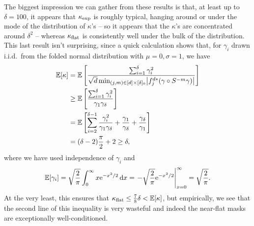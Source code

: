 The biggest impression we can gather from these results is that, at least up to $\delta = 100$, it appears that $\kappa_{\rm exp}$ is roughly typical, hanging around or under the mode of the distribution of $\kappa$'s -- so it appears that the $\kappa$'s are concentrated around $\delta^2$ -- whereas $\kappa_{\rm flat}$ is consistently well under the bulk of the distribution.  This last result isn't surprising, since a quick calculation shows that, for $\gamma_i$ drawn i.i.d.~from the folded normal distribution with $\mu = 0, \sigma = 1$, we have
\begin{align*}
  \E[\kappa] &= \E\left[\dfrac{\sum_{i = 1}^\delta \gamma_i^2}{\sqrt{d} \min_{(j, m) \in [d] \times [\delta]_0} \abs*{f_j^{d*} (\gamma \circ S^{-m} \gamma)}}\right] \\
  &\ge \E\left[\dfrac{\sum_{i = 1}^\delta \gamma_i^2}{\gamma_1 \gamma_\delta}\right] \\
  &= \E\left[\sum_{i = 2}^{\delta - 1} \frac{\gamma_i^2}{\gamma_1 \gamma_\delta} + \frac{\gamma_1}{\gamma_\delta} + \frac{\gamma_\delta}{\gamma_1}\right] \\
  &= (\delta - 2) \frac{\pi}{2} + 2 \ge \delta,
\end{align*}
where we have used independence of $\gamma_i$ and \[\mathbb{E}[\gamma_i] = \sqrt{\frac{2}{\pi}} \int_0^\infty x \mathrm{e}^{-x^2 / 2}\,\mathrm{d}x =  \left.-\sqrt{\frac{2}{\pi}} \mathrm{e}^{-x^2 / 2}\right|_{x = 0}^{\infty} = \sqrt{\frac{2}{\pi}}.\]  At the very least, this ensures that $\kappa_{\rm flat} \le \frac{7}{8} \delta < \mathbb{E}[\kappa]$, but empirically, we see that the second line of this inequality is very wasteful and indeed the near-flat masks are exceptionally well-conditioned.

